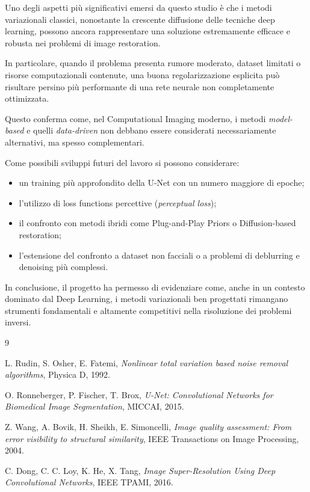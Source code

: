 \documentclass{article}
\begin{document}
Uno degli aspetti più significativi emersi da questo studio è che i metodi variazionali classici, nonostante la crescente diffusione delle tecniche deep learning, possono ancora rappresentare una soluzione estremamente efficace e robusta nei problemi di image restoration.

In particolare, quando il problema presenta rumore moderato, dataset limitati o risorse computazionali contenute, una buona regolarizzazione esplicita può risultare persino più performante di una rete neurale non completamente ottimizzata.

Questo conferma come, nel Computational Imaging moderno, i metodi \textit{model-based} e quelli \textit{data-driven} non debbano essere considerati necessariamente alternativi, ma spesso complementari.

Come possibili sviluppi futuri del lavoro si possono considerare:

\begin{itemize}
    \item un training più approfondito della U-Net con un numero maggiore di epoche;
    \item l’utilizzo di loss functions percettive (\textit{perceptual loss});
    \item il confronto con metodi ibridi come Plug-and-Play Priors o Diffusion-based restoration;
    \item l’estensione del confronto a dataset non facciali o a problemi di deblurring e denoising più complessi.
\end{itemize}

In conclusione, il progetto ha permesso di evidenziare come, anche in un contesto dominato dal Deep Learning, i metodi variazionali ben progettati rimangano strumenti fondamentali e altamente competitivi nella risoluzione dei problemi inversi.

\newpage
\begin{thebibliography}{9}

L. Rudin, S. Osher, E. Fatemi,
\textit{Nonlinear total variation based noise removal algorithms},
Physica D, 1992.

O. Ronneberger, P. Fischer, T. Brox,
\textit{U-Net: Convolutional Networks for Biomedical Image Segmentation},
MICCAI, 2015.

Z. Wang, A. Bovik, H. Sheikh, E. Simoncelli,
\textit{Image quality assessment: From error visibility to structural similarity},
IEEE Transactions on Image Processing, 2004.

C. Dong, C. C. Loy, K. He, X. Tang,
\textit{Image Super-Resolution Using Deep Convolutional Networks},
IEEE TPAMI, 2016.

\end{thebibliography}
\end{document}
